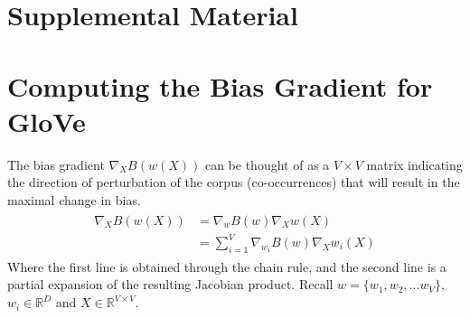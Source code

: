 \documentclass{article}
\newcommand{\Real}{\mathbb{R}}
\begin{document}




\newpage



\newpage
\onecolumn
\section*{Supplemental Material}
\appendix
\section{Computing the Bias Gradient for GloVe}

The bias gradient $\nabla_{X} B(w(X))$ can be thought of as a $V \times V$ matrix indicating the direction of perturbation of the corpus (co-occurrences) that will result in the maximal change in bias. 
\begin{align*}
\begin{split}
\nabla_{X} B(w(X)) &=  \nabla_{w} B(w) \nabla_{X} w(X) \\
                   &= \sum_{i=1}^{V} \nabla_{w_i} B(w) \nabla_{X} w_i(X)
\end{split}
\end{align*}
Where the first line is obtained through the chain rule, and the second line is a partial expansion of the resulting Jacobian product. Recall $w = \{w_1, w_2, ... w_V\}$, $w_i \in \Real^D$ and $X \in \Real^{V \times V}$.
\end{document}
